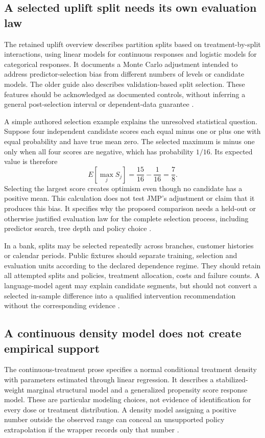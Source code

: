 \subsection{A selected uplift split needs its own evaluation law}
The retained uplift overview describes partition splits based on
treatment-by-split interactions, using linear models for continuous
responses and logistic models for categorical responses. It documents a
Monte Carlo adjustment intended to address predictor-selection bias from
different numbers of levels or candidate models. The older guide also
describes validation-based split selection. These features should be
acknowledged as documented controls, without inferring a general
post-selection interval or dependent-data guarantee
\cite{exec13_ch_jmp_uplift}.

A simple authored selection example explains the unresolved statistical
question. Suppose four independent candidate scores each equal minus one
or plus one with equal probability and have true mean zero. The selected
maximum is minus one only when all four scores are negative, which has
probability $1/16$. Its expected value is therefore
\[
 E[\max_j S_j]=\frac{15}{16}-\frac1{16}=\frac78.
\]
Selecting the largest score creates optimism even though no candidate
has a positive mean. This calculation does not test JMP's adjustment or
claim that it produces this bias. It specifies why the proposed comparison
needs a held-out or otherwise justified evaluation law for the complete
selection process, including predictor search, tree depth and policy choice
\cite{exec24_jmp_choice}.

In a bank, splits may be selected repeatedly across branches, customer
histories or calendar periods. Public fixtures should separate training,
selection and evaluation units according to the declared dependence regime.
They should retain all attempted splits and policies, treatment allocation,
costs and failure counts. A language-model agent may explain candidate
segments, but should not convert a selected in-sample difference into a
qualified intervention recommendation without the corresponding evidence
\cite{exec24_jmp_choice}.

\subsection{A continuous density model does not create empirical support}
The continuous-treatment prose specifies a normal conditional treatment
density with parameters estimated through linear regression. It describes
a stabilized-weight marginal structural model and a generalized propensity
score response model. These are particular modeling choices, not evidence
of identification for every dose or treatment distribution. A density
model assigning a positive number outside the observed range can conceal
an unsupported policy extrapolation if the wrapper records only that number
\cite{exec13_ch_jmp_causal,exec24_jmp_choice}.

